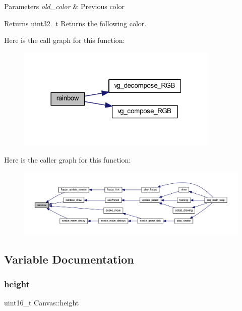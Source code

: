 \begin{DoxyParams}{Parameters}
{\em old\+\_\+color} & Previous color \\
\hline
\end{DoxyParams}
\begin{DoxyReturn}{Returns}
uint32\+\_\+t Returns the following color. 
\end{DoxyReturn}
Here is the call graph for this function\+:\nopagebreak
\begin{figure}[H]
\begin{center}
\leavevmode
\includegraphics[width=273pt]{group__canvas_ga4bac68c651bfc3551d7f9fbbdf7d0e18_cgraph}
\end{center}
\end{figure}
Here is the caller graph for this function\+:\nopagebreak
\begin{figure}[H]
\begin{center}
\leavevmode
\includegraphics[width=350pt]{group__canvas_ga4bac68c651bfc3551d7f9fbbdf7d0e18_icgraph}
\end{center}
\end{figure}


\subsection{Variable Documentation}
\mbox{\label{group__canvas_ga438a71c178c014aef3de261dbc7b483e}} 
\subsubsection{\texorpdfstring{height}{height}}
{\footnotesize\ttfamily uint16\+\_\+t Canvas\+::height}



